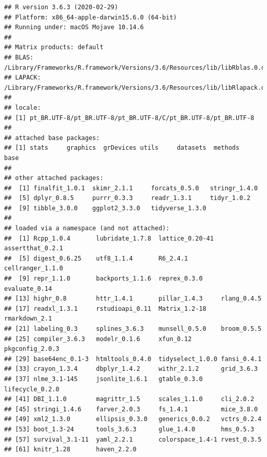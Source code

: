 \documentclass[]{article}
\begin{document}
\begin{verbatim}
## R version 3.6.3 (2020-02-29)
## Platform: x86_64-apple-darwin15.6.0 (64-bit)
## Running under: macOS Mojave 10.14.6
## 
## Matrix products: default
## BLAS:   /Library/Frameworks/R.framework/Versions/3.6/Resources/lib/libRblas.0.dylib
## LAPACK: /Library/Frameworks/R.framework/Versions/3.6/Resources/lib/libRlapack.dylib
## 
## locale:
## [1] pt_BR.UTF-8/pt_BR.UTF-8/pt_BR.UTF-8/C/pt_BR.UTF-8/pt_BR.UTF-8
## 
## attached base packages:
## [1] stats     graphics  grDevices utils     datasets  methods   base     
## 
## other attached packages:
##  [1] finalfit_1.0.1  skimr_2.1.1     forcats_0.5.0   stringr_1.4.0  
##  [5] dplyr_0.8.5     purrr_0.3.3     readr_1.3.1     tidyr_1.0.2    
##  [9] tibble_3.0.0    ggplot2_3.3.0   tidyverse_1.3.0
## 
## loaded via a namespace (and not attached):
##  [1] Rcpp_1.0.4       lubridate_1.7.8  lattice_0.20-41  assertthat_0.2.1
##  [5] digest_0.6.25    utf8_1.1.4       R6_2.4.1         cellranger_1.1.0
##  [9] repr_1.1.0       backports_1.1.6  reprex_0.3.0     evaluate_0.14   
## [13] highr_0.8        httr_1.4.1       pillar_1.4.3     rlang_0.4.5     
## [17] readxl_1.3.1     rstudioapi_0.11  Matrix_1.2-18    rmarkdown_2.1   
## [21] labeling_0.3     splines_3.6.3    munsell_0.5.0    broom_0.5.5     
## [25] compiler_3.6.3   modelr_0.1.6     xfun_0.12        pkgconfig_2.0.3 
## [29] base64enc_0.1-3  htmltools_0.4.0  tidyselect_1.0.0 fansi_0.4.1     
## [33] crayon_1.3.4     dbplyr_1.4.2     withr_2.1.2      grid_3.6.3      
## [37] nlme_3.1-145     jsonlite_1.6.1   gtable_0.3.0     lifecycle_0.2.0 
## [41] DBI_1.1.0        magrittr_1.5     scales_1.1.0     cli_2.0.2       
## [45] stringi_1.4.6    farver_2.0.3     fs_1.4.1         mice_3.8.0      
## [49] xml2_1.3.0       ellipsis_0.3.0   generics_0.0.2   vctrs_0.2.4     
## [53] boot_1.3-24      tools_3.6.3      glue_1.4.0       hms_0.5.3       
## [57] survival_3.1-11  yaml_2.2.1       colorspace_1.4-1 rvest_0.3.5     
## [61] knitr_1.28       haven_2.2.0
\end{verbatim}
\end{document}
